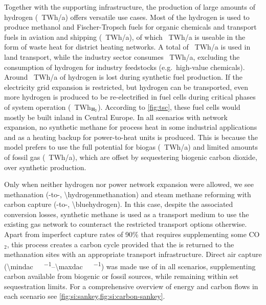 Together with the supporting infrastructure, the production of large amounts of
hydrogen (\hydrogenproduction~TWh/a) offers versatile use cases. Most of the
hydrogen is used to produce methanol and Fischer-Tropsch fuels for organic
chemicals and transport fuels in aviation and shipping
(\ptlhydrogenusage~TWh/a), of which \ptlwasteheat~TWh/a is useable  in the form
of waste heat for district heating networks. A total of
\hydrogentransportdemand~TWh/a is used in land transport, while the industry
sector consumes \hydrogenindustrydemand~TWh/a, excluding the consumption of hydrogen for
industry feedstocks (e.g.~high-value chemicals). Around \hydrogenlosses~TWh/a of
hydrogen is lost during synthetic fuel production. If the electricity grid
expansion is restricted, but hydrogen can be transported, even more hydrogen is
produced to be re-electrified in fuel cells during critical phases of system
operation (\hydrogenfuelcell~TWh$_{\ce{H2}}$). According to \cref{fig:tsc},
these fuel cells would mostly be built inland in Central Europe. In all scenarios with
network expansion, no synthetic methane for process
heat in some industrial applications and as a heating backup for power-to-heat
units is produced. This is because the model prefers to use the full potential
for biogas (\biogas~TWh/a) and limited amounts of fossil gas (\fossilgas~TWh/a),
which are offset by sequestering biogenic carbon dioxide, over synthetic
production.

Only when neither hydrogen nor power network expansion were allowed, we see
methanation (-to-, \SI{\hydrogenmethanation}{\twh}) and steam
methane reforming with carbon capture (-to-,
\SI{\bluehydrogen}{\twh}). In this case, despite the associated conversion
losses, synthetic methane is used as a transport medium to use the existing gas
network to counteract the restricted transport options otherwise. Apart from
imperfect capture rates of 90\% that requires supplementing some CO$_2$, this
process creates a carbon cycle provided that the \co is returned to the
methanation sites with an appropriate \co transport infrastructure. Direct air
capture (\SIrange{\mindac}{\maxdac}{\mega\tco\per\year}) was made use of in all
scenarios, supplementing carbon available from biogenic or fossil sources, while
remaining within set sequestration limits. For a comprehensive overview of
energy and carbon flows in each scenario see
\cref{fig:si:sankey,fig:si:carbon-sankey}.

